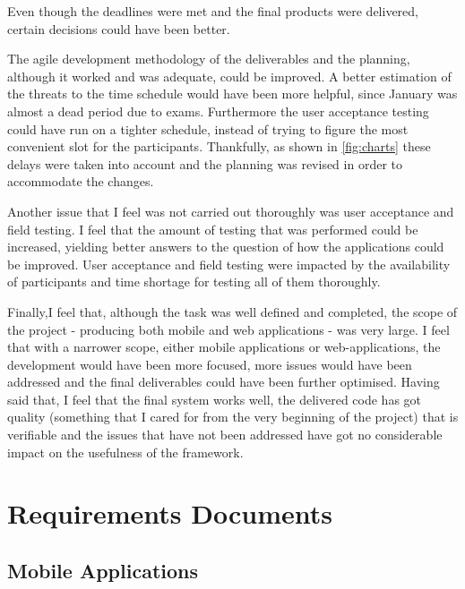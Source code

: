 \documentclass[12pt]{ecsproject}     %
\begin{document}
Even though the deadlines were met and the final products were delivered, certain decisions could have been better.

The agile development methodology of the deliverables and the planning, although it worked and was adequate, could be improved. A better estimation of the threats to the time schedule would have been more helpful, since January was almost a dead period due to exams. Furthermore the user acceptance testing could have run on a tighter schedule, instead of trying to figure the most convenient slot for the participants. Thankfully, as shown in \ref{fig:charts} these delays were taken into account and the planning was revised in order to accommodate the changes.

Another issue that I feel was not carried out thoroughly was user acceptance and field testing. I feel that the amount of testing that was performed could be increased, yielding better answers to the question of how the applications could be improved. User acceptance and field testing were impacted by the availability of participants and time shortage for testing all of them thoroughly.

Finally,I feel that, although the task was well defined and completed, the scope of the project - producing both mobile and web applications - was very large. I feel that with a narrower scope, either mobile applications or web-applications, the development would have been more focused, more issues would have been addressed and the final deliverables could have been further optimised. Having said that, I feel that the final system works well, the delivered code has got quality (something that I cared for from the very beginning of the project) that is verifiable and the issues that have not been addressed have got no considerable impact on the usefulness of the framework.



\appendix

\chapter{Requirements Documents}
\label{chap:reqcdocs}
\section{Mobile Applications }
\end{document}
